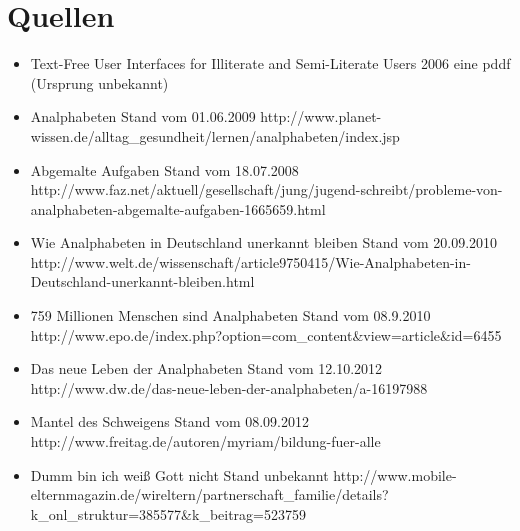  \thispagestyle{empty}

 \section*{Quellen}


\begin{itemize}
  \item {}
										{Text-Free User Interfaces for Illiterate and Semi-Literate Users}
										{2006}
										{eine pddf (Ursprung unbekannt)}

	\item {}
										{Analphabeten}
										{Stand vom 01.06.2009}
										{http://www.planet-wissen.de/alltag_gesundheit/lernen/analphabeten/index.jsp}
										
	\item {}
										{Abgemalte Aufgaben}
										{Stand vom 18.07.2008}
										{http://www.faz.net/aktuell/gesellschaft/jung/jugend-schreibt/probleme-von-analphabeten-abgemalte-aufgaben-1665659.html}
										
	\item {}
										{Wie Analphabeten in Deutschland unerkannt bleiben}
										{Stand vom 20.09.2010}
										{http://www.welt.de/wissenschaft/article9750415/Wie-Analphabeten-in-Deutschland-unerkannt-bleiben.html}
	
	\item {}
										{759 Millionen Menschen sind Analphabeten}
										{Stand vom 08.9.2010}
										{http://www.epo.de/index.php?option=com_content&view=article&id=6455}
										
	\item {}
										{Das neue Leben der Analphabeten }
										{Stand vom 12.10.2012}
										{http://www.dw.de/das-neue-leben-der-analphabeten/a-16197988}
										
	\item {}
										{Mantel des Schweigens}
										{Stand vom 08.09.2012}
										{http://www.freitag.de/autoren/myriam/bildung-fuer-alle}
										
	\item {}
										{Dumm bin ich weiß Gott nicht}
										{Stand unbekannt}
										{http://www.mobile-elternmagazin.de/wireltern/partnerschaft_familie/details?k_onl_struktur=385577&k_beitrag=523759}			
\end{itemize}
